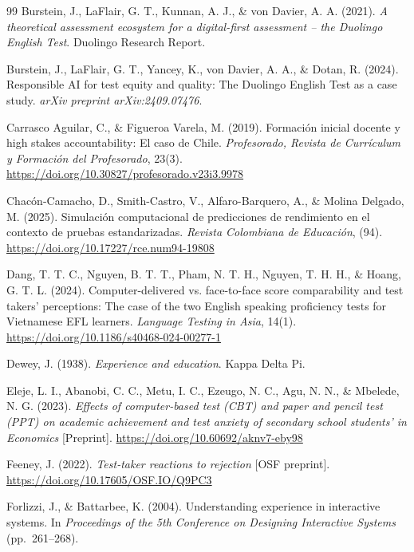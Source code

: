 \documentclass[11pt]{article}
\begin{document}
\begin{thebibliography}{99}
Burstein, J., LaFlair, G. T., Kunnan, A. J., \& von Davier, A. A. (2021). \textit{A theoretical assessment ecosystem for a digital-first assessment -- the Duolingo English Test}. Duolingo Research Report.

Burstein, J., LaFlair, G. T., Yancey, K., von Davier, A. A., \& Dotan, R. (2024). Responsible AI for test equity and quality: The Duolingo English Test as a case study. \textit{arXiv preprint arXiv:2409.07476}.

Carrasco Aguilar, C., \& Figueroa Varela, M. (2019). Formaci\'on inicial docente y high stakes accountability: El caso de Chile. \textit{Profesorado, Revista de Curr\'iculum y Formaci\'on del Profesorado}, 23(3). \url{https://doi.org/10.30827/profesorado.v23i3.9978}

Chac\'on-Camacho, D., Smith-Castro, V., Alfaro-Barquero, A., \& Molina Delgado, M. (2025). Simulaci\'on computacional de predicciones de rendimiento en el contexto de pruebas estandarizadas. \textit{Revista Colombiana de Educaci\'on}, (94). \url{https://doi.org/10.17227/rce.num94-19808}

Dang, T. T. C., Nguyen, B. T. T., Pham, N. T. H., Nguyen, T. H. H., \& Hoang, G. T. L. (2024). Computer-delivered vs. face-to-face score comparability and test takers' perceptions: The case of the two English speaking proficiency tests for Vietnamese EFL learners. \textit{Language Testing in Asia}, 14(1). \url{https://doi.org/10.1186/s40468-024-00277-1}

Dewey, J. (1938). \textit{Experience and education}. Kappa Delta Pi.

Eleje, L. I., Abanobi, C. C., Metu, I. C., Ezeugo, N. C., Agu, N. N., \& Mbelede, N. G. (2023). \textit{Effects of computer-based test (CBT) and paper and pencil test (PPT) on academic achievement and test anxiety of secondary school students' in Economics} [Preprint]. \url{https://doi.org/10.60692/aknv7-eby98}

Feeney, J. (2022). \textit{Test-taker reactions to rejection} [OSF preprint]. \url{https://doi.org/10.17605/OSF.IO/Q9PC3}

Forlizzi, J., \& Battarbee, K. (2004). Understanding experience in interactive systems. In \textit{Proceedings of the 5th Conference on Designing Interactive Systems} (pp.\ 261--268).


\end{thebibliography}
\end{document}
